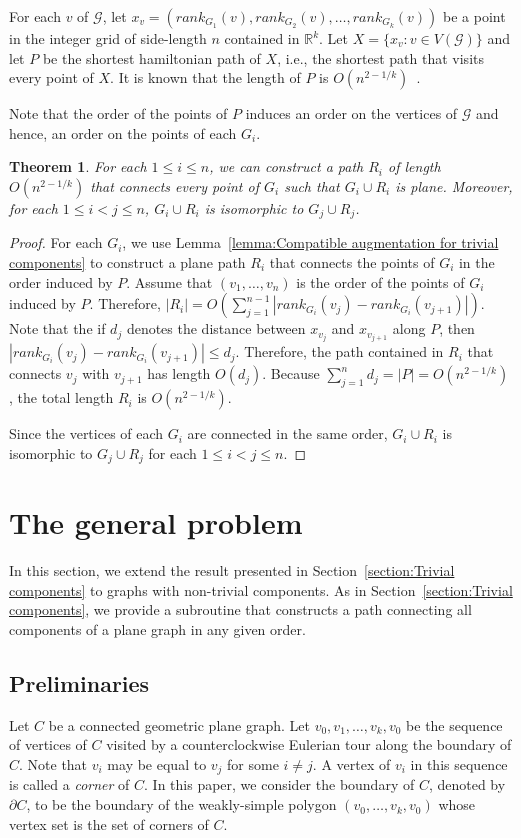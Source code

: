 \documentclass[a4paper, 11pt]{article}
\newtheorem{theorem}{Theorem}[section]
\begin{document}
For each $v$ of $\mathcal G$, let $x_v = (rank_{G_1}(v), rank_{G_2}(v), \ldots, rank_{G_k}(v))$ be a point in the integer grid of side-length $n$ contained in $\mathbb{R}^k$.
Let $X = \{x_v : v\in V(\mathcal G)\}$ and let $P$ be the shortest hamiltonian path of $X$, i.e., the shortest path that visits every point of $X$.
It is known that the length of $P$ is $O(n^{2-1/k})$~\cite{}.

Note that the order of the points of $P$ induces an order on the vertices of $\mathcal G$ and hence, an order on the points of each $G_i$. 


\begin{theorem}
For each $1\leq i\leq n$, we can construct a path $R_i$ of length $O(n^{2-1/k})$ that connects every point of $G_i$ such that $G_i\cup R_i$ is plane. Moreover, for each $1\leq i < j \leq n$, $G_i\cup R_i$ is isomorphic to $G_j\cup R_j$.
\end{theorem}
\begin{proof}
For each $G_i$, we use Lemma~\ref{lemma:Compatible augmentation for trivial components} to construct a plane path $R_i$ that connects the points of $G_i$ in the order induced by $P$.
Assume that $(v_1, \ldots, v_n)$ is the order of the points of $G_i$ induced by $P$.
Therefore, $|R_i| = O\left(\sum_{j=1}^{n-1} |rank_{G_i}(v_j) - rank_{G_i}(v_{j+1}) |\right)$.
Note that the if $d_j$ denotes the distance between $x_{v_j}$ and $x_{v_{j+1}}$ along $P$, then
$|rank_{G_i}(v_j) - rank_{G_i}(v_{j+1})|\leq  d_j$. 
Therefore, the path contained in $R_i$ that connects $v_j$ with $v_{j+1}$ has length $O(d_j)$. 
Because $\sum_{j=1}^n d_j = |P| = O(n^{2-1/k})$, the total length $R_i$ is $O(n^{2-1/k})$.

Since the vertices of each $G_i$ are connected in the same order, $G_i\cup R_i$ is isomorphic to $G_j\cup R_j$ for each $1\leq i<j\leq n$.
\end{proof}


\section{The general problem}
In this section, we extend the result presented in Section~\ref{section:Trivial components} to graphs with non-trivial components.
As in Section~\ref{section:Trivial components}, we provide a subroutine that constructs a path connecting all components of a plane graph in any given order.

\subsection{Preliminaries}\label{section:Preliminaries}
Let $C$ be a connected geometric plane graph. Let $v_0, v_1, \ldots, v_k, v_0$ be the sequence of vertices of $C$ visited by a counterclockwise Eulerian tour along the boundary of $C$. Note that $v_i$ may be equal to $v_j$ for some $i\neq j$. 
A vertex of $v_i$ in this sequence is called a \emph{corner} of $C$.
In this paper, we consider the boundary of $C$, denoted by $\partial C$, to be the boundary of the weakly-simple polygon $(v_0, \ldots, v_k, v_0)$ whose vertex set is the set of corners of $C$.
\end{document}
